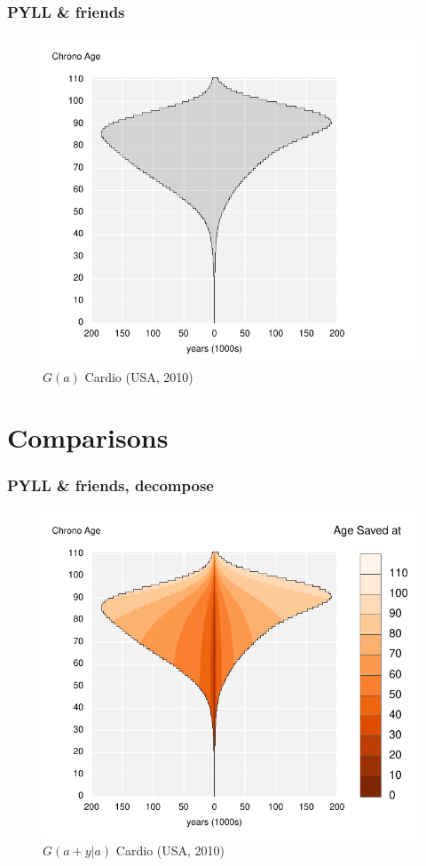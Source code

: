 \documentclass{beamer}
\begin{document}
\begin{frame}
\frametitle{PYLL \& friends}
\vspace{-1cm}
\begin{figure}[b]
    \centering
    \includegraphics[scale=.7]{Figures/f8_AgesWonc.pdf}
    \caption{$G(a)$ Cardio (USA, 2010)}
\end{figure} 
\end{frame}

\section{Comparisons}

\begin{frame}
\frametitle{PYLL \& friends, decompose}
\vspace{-1cm}
\begin{figure}[b]
    \centering
    \includegraphics[scale=.7]{Figures/f9_AgesWoncdec.pdf}
    \caption{$G(a+y|a)$ Cardio (USA, 2010)}
\end{figure} 
\end{frame}
\end{document}

